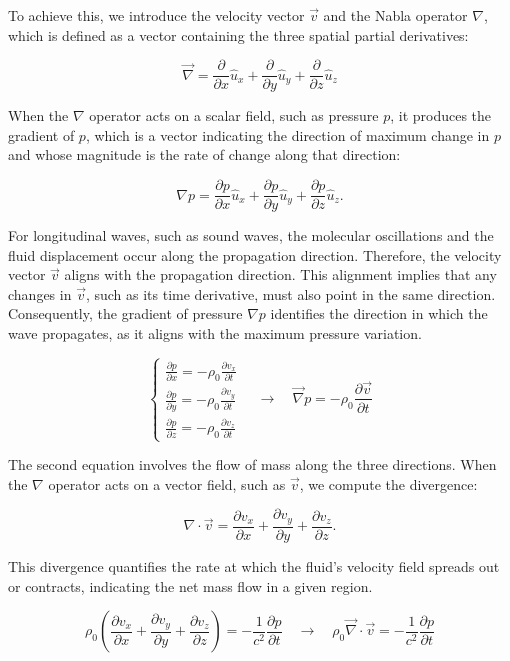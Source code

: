 \documentclass[a4paper]{article}
\begin{document}
To achieve this, we introduce the velocity vector \(\vec{v}\) and the Nabla operator \(\nabla\), which is defined as a vector containing the three spatial partial derivatives:

\[
\vec{\nabla} = \frac{\partial}{\partial x} \hat{u}_x + \frac{\partial}{\partial y} \hat{u}_y + \frac{\partial}{\partial z} \hat{u}_z
\]

When the \(\nabla\) operator acts on a scalar field, such as pressure \(p\), it produces the gradient of \(p\), which is a vector indicating the direction of maximum change in \(p\) and whose magnitude is the rate of change along that direction:

\[
\nabla p = \frac{\partial p}{\partial x} \hat{u}_x + \frac{\partial p}{\partial y} \hat{u}_y + \frac{\partial p}{\partial z} \hat{u}_z.
\]

For longitudinal waves, such as sound waves, the molecular oscillations and the fluid displacement occur along the propagation direction. Therefore, the velocity vector \(\vec{v}\) aligns with the propagation direction. This alignment implies that any changes in \(\vec{v}\), such as its time derivative, must also point in the same direction. Consequently, the gradient of pressure \(\nabla p\) identifies the direction in which the wave propagates, as it aligns with the maximum pressure variation.

\[
\begin{cases}
\frac{\partial p}{\partial x} = -\rho_0 \frac{\partial v_x}{\partial t} \\
\frac{\partial p}{\partial y} = -\rho_0 \frac{\partial v_y}{\partial t} \\
\frac{\partial p}{\partial z} = -\rho_0 \frac{\partial v_z}{\partial t}
\end{cases}
\quad \to \quad
\vec{\nabla} p = -\rho_0 \frac{\partial \vec{v}}{\partial t}
\]




The second equation involves the flow of mass along the three directions. When the \(\nabla\) operator acts on a vector field, such as \(\vec{v}\), we compute the divergence:

\[
\nabla \cdot \vec{v} = \frac{\partial v_x}{\partial x} + \frac{\partial v_y}{\partial y} + \frac{\partial v_z}{\partial z}.
\]

This divergence quantifies the rate at which the fluid's velocity field spreads out or contracts, indicating the net mass flow in a given region.

\[
\rho_0 \left( \frac{\partial v_x}{\partial x} + \frac{\partial v_y}{\partial y} + \frac{\partial v_z}{\partial z} \right) = -\frac{1}{c^2} \frac{\partial p}{\partial t}
\quad \to \quad
\rho_0 \vec{\nabla} \cdot \vec{v} = -\frac{1}{c^2} \frac{\partial p}{\partial t}
\]
\end{document}
